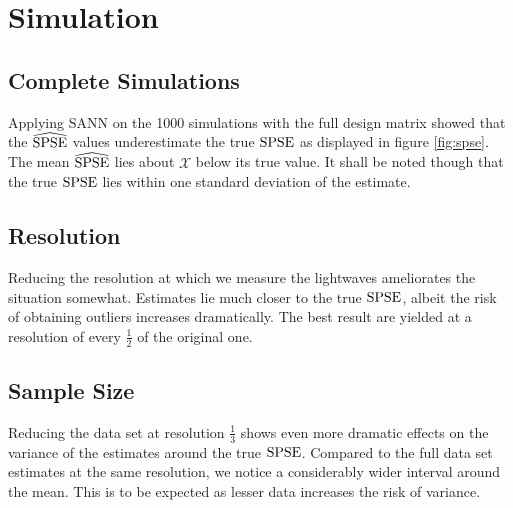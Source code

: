 \section{Simulation}
\label{sec:simulation}
	
	
	
	

	\subsection{Complete Simulations}
	\label{ssec:comp-sim}
	
		Applying SANN on the 1000 simulations with the full design matrix showed that the $\widehat{\mathrm{SPSE}}$ values underestimate the true $\mathrm{SPSE}$ as displayed in figure \ref{fig:spse}.
		The mean $\widehat{\mathrm{SPSE}}$ lies about $\mathcal{X}$ below its true value.
		It shall be noted though that the true $\mathrm{SPSE}$ lies within one standard deviation of the estimate.
	
	
	\subsection{Resolution}
	\label{ssec:resolution}
	
		Reducing the resolution at which we measure the lightwaves ameliorates the situation somewhat.
		Estimates lie much closer to the true $\mathrm{SPSE}$, albeit the risk of obtaining outliers increases dramatically.
		The best result are yielded at a resolution of every $\frac{1}{2}$ of the original one.
	
	
	\subsection{Sample Size}
	\label{ssec:samp-size}
	
		Reducing the data set at resolution $\frac{1}{3}$ shows even more dramatic effects on the variance of the estimates around the true $\mathrm{SPSE}$.
		Compared to the full data set estimates at the same resolution, we notice a considerably wider interval around the mean.
		This is to be expected as lesser data increases the risk of variance.
	

